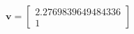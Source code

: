 \documentclass[preview]{standalone}
\begin{document}
\begin{align*}
\mathbf{v} = \begin{bmatrix} 2.2769839649484336 \\ 1\end{bmatrix}
\end{align*}
\end{document}
